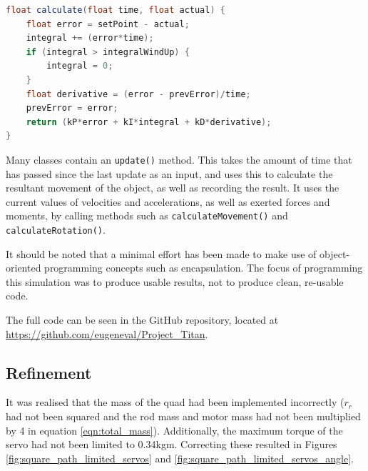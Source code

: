 \documentclass[11pt,twoside]{article}
\begin{document}
\begin{lstlisting}[language=Java]
float calculate(float time, float actual) {
    float error = setPoint - actual;
    integral += (error*time);
    if (integral > integralWindUp) {
        integral = 0;
    }
    float derivative = (error - prevError)/time;
    prevError = error;
    return (kP*error + kI*integral + kD*derivative);
}
\end{lstlisting}

Many classes contain an \lstinline|update()| method. This takes the amount of time that has passed since the last update as an input, and uses this to calculate the resultant movement of the object, as well as recording the result. It uses the current values of velocities and accelerations, as well as exerted forces and moments, by calling methods such as \lstinline|calculateMovement()| and \lstinline|calculateRotation()|.

It should be noted that a minimal effort has been made to make use of object-oriented programming concepts such as encapsulation. The focus of programming this simulation was to produce usable results, not to produce clean, re-usable code.

The full code can be seen in the GitHub repository, located at \url{https://github.com/eugeneval/Project_Titan}.


\subsection{Refinement}
It was realised that the mass of the quad had been implemented incorrectly ($r_r$ had not been squared and the rod mass and motor mass had not been multiplied by 4 in equation \ref{eqn:total_mass}). Additionally, the maximum torque of the servo had not been limited to 0.34kgm. Correcting these resulted in Figures \ref{fig:square_path_limited_servos} and \ref{fig:square_path_limited_servos_angle}.
\end{document}
